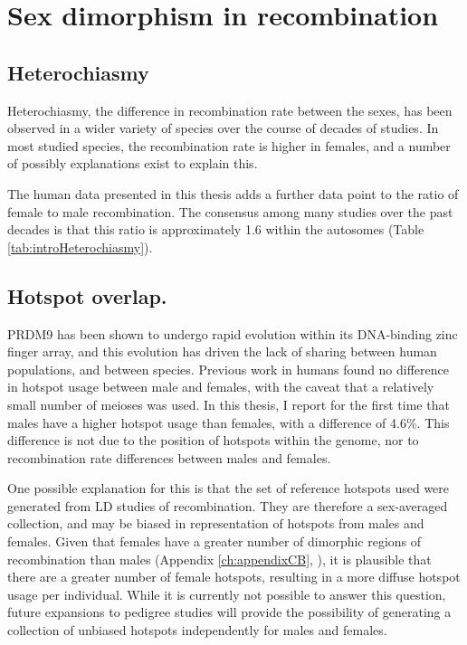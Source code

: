 \section{Sex dimorphism in recombination}

\subsection{Heterochiasmy}

Heterochiasmy, the difference in recombination rate between the sexes, has been observed in a wider variety of species over the course of decades of studies.
In most studied species, the recombination rate is higher in females, and a number of possibly explanations exist to explain this.

The human data presented in this thesis adds a further data point to the ratio of female to male recombination.
The consensus among many studies over the past decades is that this ratio is approximately 1.6 within the autosomes (Table \ref{tab:introHeterochiasmy}).

\subsection{Hotspot overlap.}

PRDM9 has been shown to undergo rapid evolution within its DNA-binding zinc finger array\cite{Oliver2009,Ponting2011}, and this evolution has driven the lack of sharing between human populations\cite{Hinch2011}, and between species\cite{Auton2012a}.
Previous work in humans found no difference in hotspot usage between male and females\cite{Coop2008}, with the caveat that a relatively small number of meioses was used.
In this thesis, I report for the first time that males have a higher hotspot usage than females, with a difference of 4.6\%.
This difference is not due to the position of hotspots within the genome, nor to recombination rate differences between males and females.

One possible explanation for this is that the set of reference hotspots used were generated from LD studies of recombination\cite{Myers2005,hapmap2007}.
They are therefore a sex-averaged collection, and may be biased in representation of hotspots from males and females.
Given that females have a greater number of dimorphic regions of recombination than males (Appendix \ref{ch:appendixCB}, \citet{Bherer2016}), it is plausible that there are a greater number of female hotspots, resulting in a more diffuse hotspot usage per individual.
While it is currently not possible to answer this question, future expansions to pedigree studies will provide the possibility of generating a collection of unbiased hotspots independently for males and females.


